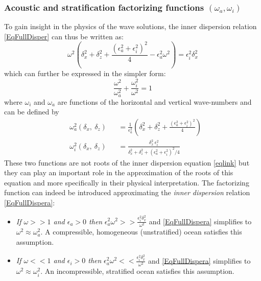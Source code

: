 \documentclass[a4paper,11pt]{article}
\begin{document}
\subsubsection{Acoustic and stratification factorizing functions $(\omega_a, \omega_i)$}
\label{subsubsectionFacto}
To gain insight in the physics of the wave solutions, the inner dispersion relation \ref{EqFullDisper} can thus be written as:\\
\begin{equation}
\omega^2
	\left(
	\delta_x^2+\delta_z^2
	+\frac{(\epsilon_a^2+\epsilon_i^2)^2}{4}
	-\epsilon_a^2\omega^2
	\right)
	=\epsilon_i^2 \delta_x^2
	\label{eqomegaparam2}
\end{equation}
which can further be expressed in the simpler form:
\begin{equation}
	\frac{\omega^2}{\omega_a^2}+\frac{\omega_i^2}{\omega^2}=1
	\label{eqlink}
\end{equation}
where $\omega_i$ and $\omega_a$ are functions of the horizontal and vertical wave-numbers and can be defined by
\begin{subequations}
	\label{EqDispSols}
	\begin{alignat}{2}	
	\label{SolAcous}
	& \omega_a^2(\delta_x,\ \delta_z) &&=\frac{1}{\epsilon_a^2}\left(
	\delta_x^2+\delta_z^2
	+\frac{(\epsilon_a^2+\epsilon_i^2)^2}{4}
	\right)\\
	\label{SolGrav}
	&\omega_i^2(\delta_x,\ \delta_z)  &&=
	\frac{\delta_x^2\ \epsilon_i^2}{\delta_x^2+\delta_z^2
	+(\epsilon_a^2+\epsilon_i^2)^2/4}
	\end{alignat}
\end{subequations}
These two functions are not roots of the inner dispersion equation \ref{eqlink} but they can play an important role in the approximation of the roots of this equation and more specifically in their physical interpretation. The factorizing function can indeed be introduced approximating the \textit{inner dispersion} relation \ref{EqFullDispera}:
\begin{itemize}
	\item \textit{If $\omega>>1$ and $\epsilon_a>0$ then} 
	$\epsilon_a^2\omega^2 >> \frac{\epsilon_i^2\delta_x^2}{\omega^2}$ and \ref{EqFullDispera} simplifies to 
	$\omega^2\approx\omega_a^2$. A compressible, homogeneous (unstratified) ocean satisfies this assumption.
	\item \textit{If $\omega<<1$ and $\epsilon_i>0$ then} $\epsilon_a^2\omega^2<< \frac{\epsilon_i^2\delta_x^2}{\omega^2}$ and \ref{EqFullDispera} simplifies to $\omega^2\approx\omega_i^2$. An incompressible, stratified ocean satisfies this assumption.
\end{itemize}
\end{document}
